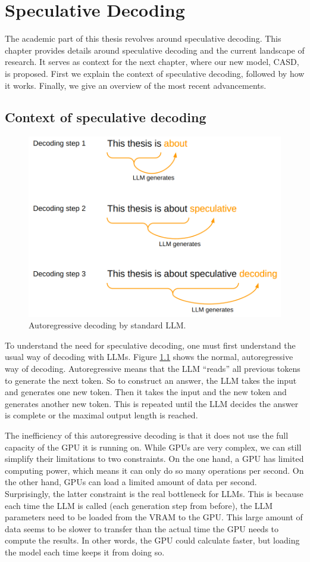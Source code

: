 
\chapter{Speculative Decoding}
\label{sec:speculative_decoding}

The academic part of this thesis revolves around speculative decoding. This chapter provides details around speculative decoding and the current landscape of research. It serves as context for the next chapter, where our new model, CASD, is proposed. First we explain the context of speculative decoding, followed by how it works. Finally, we give an overview of the most recent advancements. 

\section{Context of speculative decoding}

\begin{figure}[h]
	\centering
	\includegraphics[width=0.7\linewidth]{fig/spec_dec_autoregressive.png}
	\caption{Autoregressive decoding by standard LLM.}
	\label{fig:spec_dec_autoregressive}
\end{figure}

To understand the need for speculative decoding, one must first understand the usual way of decoding with LLMs. Figure \ref{fig:spec_dec_autoregressive} shows the normal, autoregressive way of decoding. Autoregressive means that the LLM ``reads'' all previous tokens to generate the next token. So to construct an answer, the LLM takes the input and generates one new token. Then it takes the input and the new token and generates another new token. This is repeated until the LLM decides the answer is complete or the maximal output length is reached.

The inefficiency of this autoregressive decoding is that it does not use the full capacity of the GPU it is running on. While GPUs are very complex, we can still simplify their limitations to two constraints. On the one hand, a GPU has limited computing power, which means it can only do so many operations per second. On the other hand, GPUs can load a limited amount of data per second. Surprisingly, the latter constraint is the real bottleneck for LLMs. This is because each time the LLM is called (each generation step from before), the LLM parameters need to be loaded from the VRAM to the GPU. This large amount of data seems to be slower to transfer than the actual time the GPU needs to compute the results. In other words, the GPU could calculate faster, but loading the model each time keeps it from doing so.

